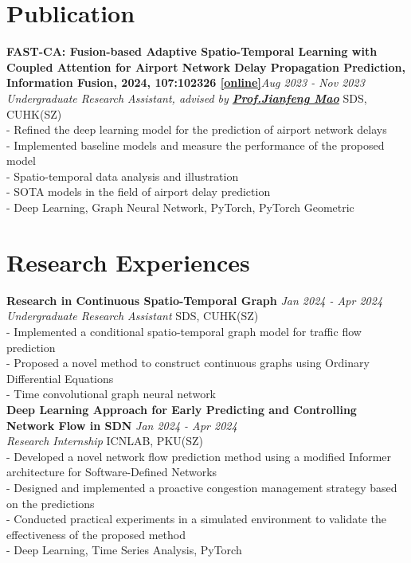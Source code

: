 \documentclass[a4paper,10pt]{article}
\begin{document}
\section*{Publication}
\textbf{FAST-CA: Fusion-based Adaptive Spatio-Temporal Learning with Coupled Attention for Airport Network Delay Propagation Prediction, Information Fusion, 2024, 107:102326 \href{https://www.sciencedirect.com/science/article/pii/S1566253524001040}{[online]}}\hfill \textit{Aug 2023 - Nov 2023}\\
\textit{Undergraduate Research Assistant, advised by \textbf{\href{https://sds.cuhk.edu.cn/en/teacher/268}{Prof.\@ Jianfeng Mao}}} \hfill SDS, CUHK(SZ)\\
- Refined the deep learning model for the prediction of airport network delays\\
- Implemented baseline models and measure the performance of the proposed model\\
- Spatio-temporal data analysis and illustration\\
- SOTA models in the field of airport delay prediction\\
- Deep Learning, Graph Neural Network, PyTorch, PyTorch Geometric
\section*{Research Experiences}
\textbf{Research in Continuous Spatio-Temporal Graph} \hfill \textit{Jan 2024 - Apr 2024}\\
\textit{Undergraduate Research Assistant} \hfill SDS, CUHK(SZ)\\
- Implemented a conditional spatio-temporal graph model for traffic flow prediction\\
- Proposed a novel method to construct continuous graphs using Ordinary Differential Equations\\
- Time convolutional graph neural network\\
\textbf{Deep Learning Approach for Early Predicting and Controlling Network Flow in SDN} \hfill \textit{Jan 2024 - Apr 2024}\\
\textit{Research Internship} \hfill ICNLAB, PKU(SZ)\\
- Developed a novel network flow prediction method using a modified Informer architecture for Software-Defined Networks\\
- Designed and implemented a proactive congestion management strategy based on the predictions\\
- Conducted practical experiments in a simulated environment to validate the effectiveness of the proposed method\\
- Deep Learning, Time Series Analysis, PyTorch
\end{document}

